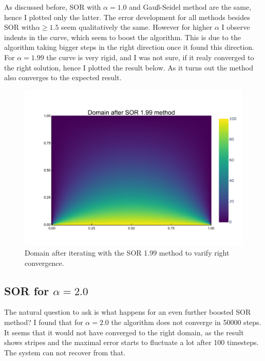 \documentclass[
	a4paper, %
	10pt, %
]{CSUniSchoolLabReport}
\begin{document}
As discussed before, SOR with $\alpha=1.0$ and Gauß-Seidel method are the same, hence I plotted only the latter. The error development for all methods besides SOR with$\alpha\geq 1.5$ seem qualitatively the same. However for higher $\alpha$ I observe indents in the curve, which seem to boost the algorithm. This is due to the algorithm taking bigger steps in the right direction once it found this direction. 
For $\alpha=1.99$ the curve is very rigid, and I was not sure, if it realy converged to the right solution, hence I plotted the result below. As it turns out the method also converges to the expected result.

\begin{figure}[H]
	\includegraphics[width=\textwidth]{../saves_t1/sor199_heatmap.pdf}
	\caption{Domain after iterating with the SOR 1.99 method to varify right convergence.}
\end{figure}

\subsection{SOR for $\alpha=2.0$}

The natural question to ask is what happens for an even further boosted SOR method? I found that for $\alpha = 2.0$ the algorithm does not converge in  50000 steps. It seems that it would not have converged to the right domain, as the result shows stripes and the maximal error starts to fluctuate a lot after 100 timesteps. The system can not recover from that.
\end{document}
